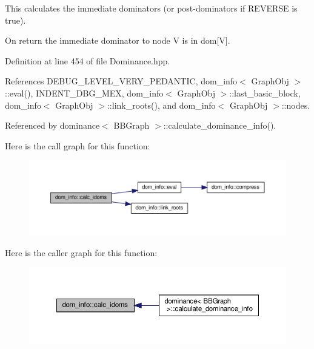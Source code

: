 This calculates the immediate dominators (or post-\/dominators if R\+E\+V\+E\+R\+SE is true). 

On return the immediate dominator to node V is in dom\mbox{[}V\mbox{]}. 

Definition at line 454 of file Dominance.\+hpp.



References D\+E\+B\+U\+G\+\_\+\+L\+E\+V\+E\+L\+\_\+\+V\+E\+R\+Y\+\_\+\+P\+E\+D\+A\+N\+T\+IC, dom\+\_\+info$<$ Graph\+Obj $>$\+::eval(), I\+N\+D\+E\+N\+T\+\_\+\+D\+B\+G\+\_\+\+M\+EX, dom\+\_\+info$<$ Graph\+Obj $>$\+::last\+\_\+basic\+\_\+block, dom\+\_\+info$<$ Graph\+Obj $>$\+::link\+\_\+roots(), and dom\+\_\+info$<$ Graph\+Obj $>$\+::nodes.



Referenced by dominance$<$ B\+B\+Graph $>$\+::calculate\+\_\+dominance\+\_\+info().

Here is the call graph for this function\+:
\nopagebreak
\begin{figure}[H]
\begin{center}
\leavevmode
\includegraphics[width=350pt]{d3/dea/classdom__info_a814bd35f207ecedcb14aee48eb548d32_cgraph}
\end{center}
\end{figure}
Here is the caller graph for this function\+:
\nopagebreak
\begin{figure}[H]
\begin{center}
\leavevmode
\includegraphics[width=350pt]{d3/dea/classdom__info_a814bd35f207ecedcb14aee48eb548d32_icgraph}
\end{center}
\end{figure}
\mbox{\label{classdom__info_ab71b2fc1d5013a6deae14d348e4e74a6}} 
